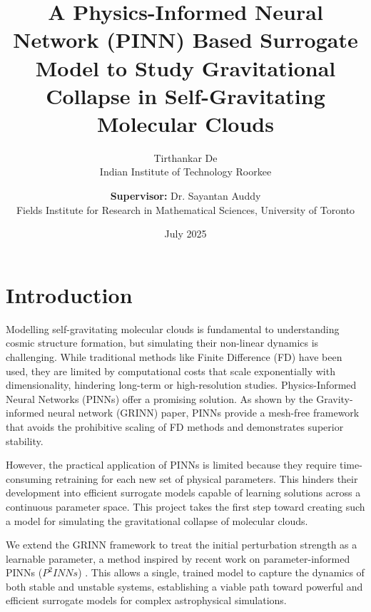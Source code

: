\documentclass{article}
\title{A Physics-Informed Neural Network (PINN) Based Surrogate Model to Study Gravitational Collapse in Self-Gravitating Molecular Clouds}
\author{
  Tirthankar De \\
  Indian Institute of Technology Roorkee \\
  \and
  \textbf{Supervisor:} Dr. Sayantan Auddy \\
  Fields Institute for Research in Mathematical Sciences, University of Toronto
}
\date{July 2025}
\begin{document}
\maketitle

\section{Introduction}
Modelling self-gravitating molecular clouds is fundamental to understanding cosmic structure formation, but simulating their non-linear dynamics is challenging. While traditional methods like Finite Difference (FD) have been used, they are limited by computational costs that scale exponentially with dimensionality, hindering long-term or high-resolution studies. Physics-Informed Neural Networks (PINNs) offer a promising solution. As shown by the Gravity-informed neural network (GRINN) \cite{auddy2023grinnphysicsinformedneuralnetwork} paper, PINNs provide a mesh-free framework that avoids the prohibitive scaling of FD methods and demonstrates superior stability. 

However, the practical application of PINNs is limited because they require time-consuming retraining for each new set of physical parameters. This hinders their development into efficient surrogate models capable of learning solutions across a continuous parameter space. This project takes the first step toward creating such a model for simulating the gravitational collapse of molecular clouds. 

We extend the GRINN framework to treat the initial perturbation strength as a learnable parameter, a method inspired by recent work on parameter-informed PINNs (${P^2INNs}$) \cite{cho2024parameterizedphysicsinformedneuralnetworks}. This allows a single, trained model to capture the dynamics of both stable and unstable systems, establishing a viable path toward powerful and efficient surrogate models for complex astrophysical simulations. 
\end{document}
